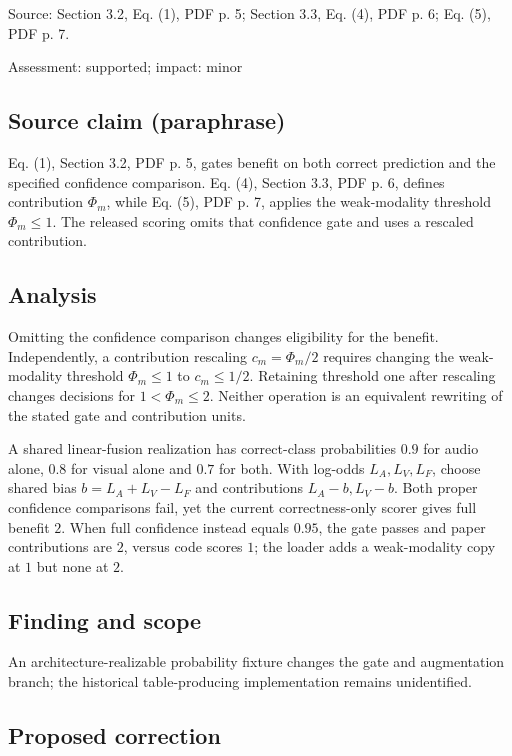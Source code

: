 \documentclass[11pt]{article}
\begin{document}
Source: Section 3.2, Eq. (1), PDF p. 5; Section 3.3, Eq. (4), PDF p. 6; Eq. (5), PDF p. 7.

Assessment: supported; impact: minor

\subsection*{Source claim (paraphrase)}

Eq. (1), Section 3.2, PDF p. 5, gates benefit on both correct prediction and the specified confidence comparison. Eq. (4), Section 3.3, PDF p. 6, defines contribution \(\Phi_m\), while Eq. (5), PDF p. 7, applies the weak-modality threshold \(\Phi_m\le1\). The released scoring omits that confidence gate and uses a rescaled contribution.

\subsection*{Analysis}

Omitting the confidence comparison changes eligibility for the benefit. Independently, a contribution rescaling \(c_m=\Phi_m/2\) requires changing the weak-modality threshold \(\Phi_m\le1\) to \(c_m\le1/2\). Retaining threshold one after rescaling changes decisions for \(1<\Phi_m\le2\). Neither operation is an equivalent rewriting of the stated gate and contribution units.

A shared linear-fusion realization has correct-class probabilities \(0.9\) for audio alone, \(0.8\) for visual alone and \(0.7\) for both. With log-odds \(L_A,L_V,L_F\), choose shared bias \(b=L_A+L_V-L_F\) and contributions \(L_A-b,L_V-b\). Both proper confidence comparisons fail, yet the current correctness-only scorer gives full benefit \(2\). When full confidence instead equals \(0.95\), the gate passes and paper contributions are \(2\), versus code scores \(1\); the loader adds a weak-modality copy at \(1\) but none at \(2\).

\subsection*{Finding and scope}

An architecture-realizable probability fixture changes the gate and augmentation branch; the historical table-producing implementation remains unidentified.

\subsection*{Proposed correction}
\end{document}
